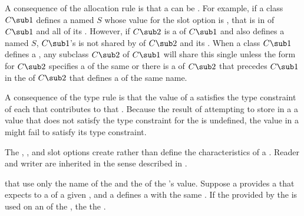 \endlist

A consequence of the allocation rule is that a  can be
.  For example, if a class $C\sub 1$ defines 
a  named $S$
whose value for the  slot option is ,
that  is  
in  of $C\sub 1$ and all of its
.  However, if $C\sub 2$ is a  
of $C\sub 1$ and also
defines a  named $S$\negthinspace, $C\sub 1$'s 
 is not shared
by  of $C\sub 2$ and its . When a class
$C\sub 1$ defines a , any subclass $C\sub 2$ of $C\sub
1$ will share this single  
unless the  form for
$C\sub 2$ specifies a  of the same 
 or there is a 
of $C\sub 2$ that precedes $C\sub 1$ in the  of
$C\sub 2$ that defines a  of the same name.

A consequence of the type rule is that the value of a 
satisfies the type constraint of each  that
contributes to that .  Because the result of attempting to
store in a  a value that does not satisfy the type
constraint for the  is undefined, the value in a 
might fail to satisfy its type constraint.
     
The , , and  slot options
create  rather than define the characteristics of a .
Reader and writer  are inherited in the sense described in
\secref\MethodInheritance.

 that   use only the name of the
 and the  of the 's value.  Suppose
a  provides a  that expects to  a
 of a given , and a  defines
a  with the same .  If the  provided 
by the  is used on an  of the , 
the   the .

\endsubsection%

